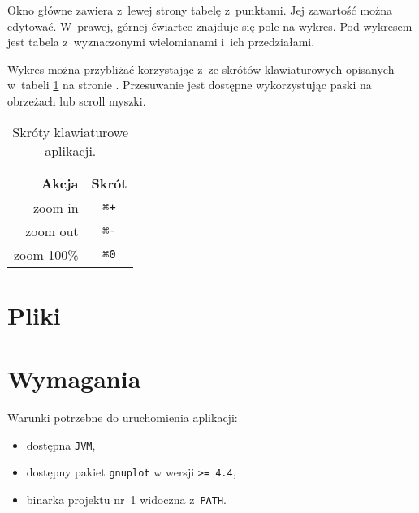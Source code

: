 \documentclass[10pt,a4paper]{article}
\newcommand{\prog}[1]{\texttt{#1}}
\begin{document}
Okno główne zawiera z~lewej strony tabelę z~punktami. Jej zawartość można
edytować. W~prawej, górnej ćwiartce znajduje się pole na wykres. Pod wykresem
jest tabela z~wyznaczonymi wielomianami i~ich przedziałami.

Wykres można przybliżać korzystając z~ze skrótów klawiaturowych opisanych
w~tabeli \ref{tab:skroty} na stronie \pageref{tab:skroty}. Przesuwanie jest
dostępne wykorzystując paski na obrzeżach lub scroll myszki.

\begin{table}[p]
  \centering
  \begin{tabular}{r c}
    \toprule
    {\bf Akcja} & {\bf Skrót} \\
    \midrule
    zoom in     &  \prog{⌘+}  \\
    zoom out    &  \prog{⌘-}  \\
    zoom 100\%  &  \prog{⌘0}  \\
    \bottomrule
  \end{tabular}
  \caption{Skróty klawiaturowe aplikacji.}
  \label{tab:skroty}
\end{table}

\section{Pliki}
\label{sec:pliki}

\section{Wymagania}
\label{sec:wymagania}

Warunki potrzebne do uruchomienia aplikacji:
\begin{itemize}
  \item dostępna \prog{JVM},
  \item dostępny pakiet \prog{gnuplot} w wersji \prog{>= 4.4},
  \item binarka projektu nr~1 widoczna z~\prog{PATH}.
\end{itemize}
\end{document}
